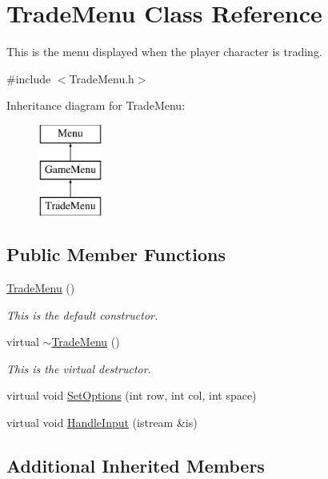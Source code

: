 \hypertarget{classTradeMenu}{\section{Trade\-Menu Class Reference}
\label{classTradeMenu}
}


This is the menu displayed when the player character is trading.  




{\ttfamily \#include $<$Trade\-Menu.\-h$>$}

Inheritance diagram for Trade\-Menu\-:\begin{figure}[H]
\begin{center}
\leavevmode
\includegraphics[height=3.000000cm]{classTradeMenu}
\end{center}
\end{figure}
\subsection*{Public Member Functions}
\begin{DoxyCompactItemize}
\item 
\hyperlink{classTradeMenu_a3b09de2db8d3b7a1f88fe9b62fe7b4ec}{Trade\-Menu} ()
\begin{DoxyCompactList}\small\item\em This is the default constructor. \end{DoxyCompactList}\item 
virtual \hyperlink{classTradeMenu_ac2cf70176a9ad343276dcaa6a4917e99}{$\sim$\-Trade\-Menu} ()
\begin{DoxyCompactList}\small\item\em This is the virtual destructor. \end{DoxyCompactList}\item 
virtual void \hyperlink{classTradeMenu_aaf93d0a5ee2574d2926bd22de278fb17}{Set\-Options} (int row, int col, int space)
\item 
virtual void \hyperlink{classTradeMenu_a367004a0b1ceccd4517de8dea1e1d210}{Handle\-Input} (istream \&is)
\end{DoxyCompactItemize}
\subsection*{Additional Inherited Members}


